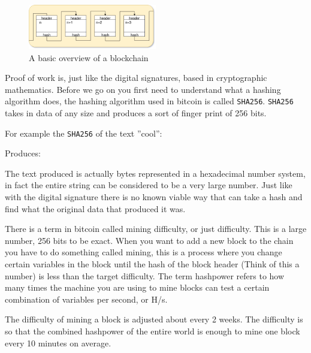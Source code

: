 \begin{figure}[H]
	\centering
	\includegraphics[width=0.5\textwidth]{introduction/images/blockchain.png}
	\caption{A basic overview of a blockchain}
	\label{fig:blockchain}
\end{figure}

Proof of work is, just like the digital signatures, based in cryptographic mathematics. Before we go on you first need to understand what a hashing algorithm does, the hashing algorithm used in bitcoin is called \texttt{SHA256}. \texttt{SHA256} takes in data of any size and produces a sort of finger print of 256 bits. 

For example the \texttt{SHA256} of the text ''cool'': 


Produces: 


The text produced is actually bytes represented in a hexadecimal number system, in fact the entire string can be considered to be a very large number. Just like with the digital signature there is no known viable way that can take a hash and find what the original data that produced it was. 

There is a term in bitcoin called mining difficulty, or just difficulty. This is a large number, 256 bits to be exact. When you want to add a new block to the chain you have to do something called mining, this is a process where you change certain variables in the block until the hash of the block header (Think of this a number) is less than the target difficulty. The term hashpower refers to how many times the machine you are using to mine blocks can test a certain combination of variables per second, or H/s.

The difficulty of mining a block is adjusted about every 2 weeks. The difficulty is so that the combined hashpower of the entire world is enough to mine one block every 10 minutes on average.\cite{antonopoulos_2017}

